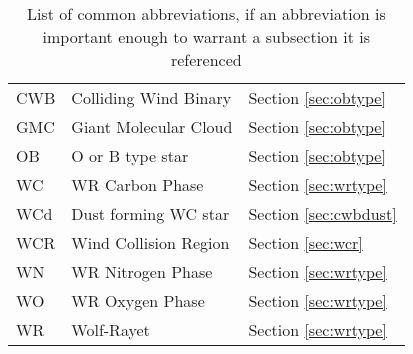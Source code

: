 \begin{abbreviations}

\begin{table}[h]
  \centering
  \begin{tabular}{l|l|l}
    
    \hline

    CWB & Colliding Wind Binary  & Section \ref{sec:obtype} \\
    GMC & Giant Molecular Cloud & Section \ref{sec:obtype}\\
    OB  & O or B type star & Section \ref{sec:obtype} \\ 
    WC  & WR Carbon Phase & Section \ref{sec:wrtype} \\
    WCd & Dust forming WC star & Section \ref{sec:cwbdust} \\
    WCR & Wind Collision Region & Section \ref{sec:wcr} \\
    WN  & WR Nitrogen Phase & Section \ref{sec:wrtype} \\
    WO  & WR Oxygen Phase & Section \ref{sec:wrtype} \\
    WR  & Wolf-Rayet & Section \ref{sec:wrtype} \\

    \hline

  \end{tabular} 
  \label{tbl:Abbreviations}
  \caption{List of common abbreviations, if an abbreviation is important enough to warrant a subsection it is referenced}
  \end{table}

\end{abbreviations}
